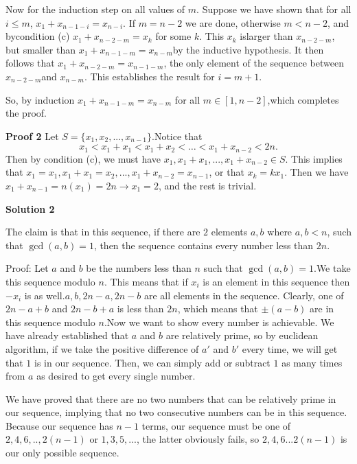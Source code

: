 \begin{enumerate}
 Now for the induction step on all values of $m$. Suppose we have shown that for all $i \le m$, $x_1 + x_{n-1-i} = x_{n-i}$.  If $m = n-2$ we are done, otherwise $m < n-2$, and bycondition (c) $x_1 + x_{n-2-m} = x_k$ for some $k$. This $x_k$ islarger than $x_{n-2-m}$, but smaller than $x_1 + x_{n-1-m} = x_{n-m}$by the inductive hypothesis. It then follows that $x_1 + x_{n-2-m} = x_{n-1-m}$, the only element of the sequence between $x_{n-2-m}$and $x_{n-m}$. This establishes the result for $i=m+1$.

 So, by induction $x_1 + x_{n-1-m} = x_{n-m}$ for all $m \in [1, n-2]$,which completes the proof.

 \textbf{Proof 2} Let $S=\{x_1,x_2,...,x_{n-1}\}$.Notice that 
 \[x_1<x_1+x_1<x_1+x_2<\dots <x_1+x_{n-2}<2n.\] Then by condition (c), we must have $x_1,x_1+x_1,...,x_1+x_{n-2}\in S$. This implies that $x_1=x_1,x_1+x_1=x_2,...,x_1+x_{n-2}=x_{n-1}$, or that $x_k=kx_1$. Then we have $x_1+x_{n-1}=n(x_1)=2n\rightarrow x_1=2$, and the rest is trivial.

 



\textbf{Solution 2}

The claim is that in this sequence, if there are $2$ elements $a,b$ where $a,b<n$, such that $\gcd(a,b)=1$, then the sequence contains every number less than $2n$.

 Proof: Let $a$ and $b$ be the numbers less than $n$ such that $\gcd(a,b)=1$.We take this sequence modulo $n$. This means that if $x_i$ is an element in this sequence then $-x_i$ is as well.$a,b,2n-a,2n-b$ are all elements in the sequence. Clearly, one of $2n-a+b$ and $2n-b+a$ is less than $2n$, which means that $\pm (a-b)$ are in this sequence modulo $n$.Now we want to show every number is achievable. We have already established that $a$ and $b$ are relatively prime, so by euclidean algorithm, if we take the positive difference of $a'$ and $b'$ every time, we will get that $1$ is in our sequence. Then, we can simply add or subtract $1$ as many times from $a$ as desired to get every single number.

 We have proved that there are no two numbers that can be relatively prime in our sequence, implying that no two consecutive numbers can be in this sequence. Because our sequence has $n-1$ terms, our sequence must be one of $2,4,6,..,2(n-1)$ or $1,3,5,...$, the latter obviously fails, so $2,4,6...2(n-1)$ is our only possible sequence.

 




\end{enumerate}
